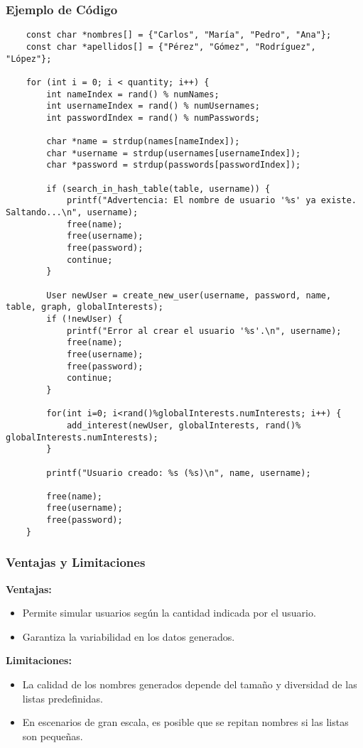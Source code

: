 \documentclass[9pt,letterpaper,onecolumn]{rho-class/rho}
\begin{document}
    \subsubsection{Ejemplo de Código}
    \begin{verbatim}
    const char *nombres[] = {"Carlos", "María", "Pedro", "Ana"};
    const char *apellidos[] = {"Pérez", "Gómez", "Rodríguez", "López"};

    for (int i = 0; i < quantity; i++) {
        int nameIndex = rand() % numNames;
        int usernameIndex = rand() % numUsernames;
        int passwordIndex = rand() % numPasswords;

        char *name = strdup(names[nameIndex]);
        char *username = strdup(usernames[usernameIndex]);
        char *password = strdup(passwords[passwordIndex]);

        if (search_in_hash_table(table, username)) {
            printf("Advertencia: El nombre de usuario '%s' ya existe. Saltando...\n", username);
            free(name);
            free(username);
            free(password);
            continue;
        }

        User newUser = create_new_user(username, password, name, table, graph, globalInterests);
        if (!newUser) {
            printf("Error al crear el usuario '%s'.\n", username);
            free(name);
            free(username);
            free(password);
            continue;
        }

        for(int i=0; i<rand()%globalInterests.numInterests; i++) {
            add_interest(newUser, globalInterests, rand()% globalInterests.numInterests);
        }

        printf("Usuario creado: %s (%s)\n", name, username);

        free(name);
        free(username);
        free(password);
    }
    \end{verbatim}

    \subsubsection{Ventajas y Limitaciones}
    \textbf{Ventajas:}
    \begin{itemize}
        \item Permite simular usuarios según la cantidad indicada por el usuario.
        \item Garantiza la variabilidad en los datos generados.
    \end{itemize}
    \textbf{Limitaciones:}
    \begin{itemize}
        \item La calidad de los nombres generados depende del tamaño y diversidad de las listas predefinidas.
        \item En escenarios de gran escala, es posible que se repitan nombres si las listas son pequeñas.
    \end{itemize}
\end{document}

